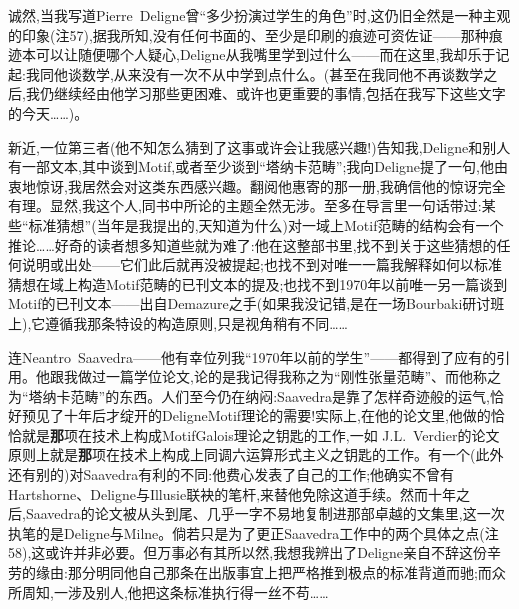 诚然,当我写道Pierre~Deligne曾“多少扮演过学生的角色”时,这仍旧全然是一种主观的印象(注57),据我所知,没有任何书面的、至少是印刷的痕迹可资佐证——那种痕迹本可以让随便哪个人疑心,Deligne从我嘴里学到过什么——而在这里,我却乐于记起:我同他谈数学,从来没有一次不从中学到点什么。(甚至在我同他不再谈数学之后,我仍继续经由他学习那些更困难、或许也更重要的事情,包括在我写下这些文字的今天……)。

\pmark 新近,一位第三者(他不知怎么猜到了这事或许会让我感兴趣!)告知我,Deligne和别人有一部文本,其中谈到Motif,或者至少谈到“塔纳卡范畴”;我向Deligne提了一句,他由衷地惊讶,我居然会对这类东西感兴趣。翻阅他惠寄的那一册,我确信他的惊讶完全有理。显然,我这个人,同书中所论的主题全然无涉。至多在导言里一句话带过:某些“标准猜想”(当年是我提出的,天知道为什么)对一域上Motif范畴的结构会有一个推论……好奇的读者想多知道些就为难了:他在这整部书里,找不到关于这些猜想的任何说明或出处——它们此后就再没被提起;也找不到对唯一一篇我解释如何以标准猜想在域上构造Motif范畴的已刊文本的提及;也找不到1970年以前唯一另一篇谈到Motif的已刊文本——出自Demazure之手(如果我没记错,是在一场Bourbaki研讨班上),它遵循我那条特设的构造原则,只是视角稍有不同……

\pmark 连Neantro~Saavedra——他有幸位列我“1970年以前的学生”——都得到了应有的引用。他跟我做过一篇学位论文,论的是我记得我称之为“刚性张量范畴”、而他称之为“塔纳卡范畴”的东西。人们至今仍在纳闷:Saavedra是靠了怎样奇迹般的运气,恰好预见了十年后才绽开的DeligneMotif理论的需要!实际上,在他的论文里,他做的恰恰就是\textbf{那}项在技术上构成MotifGalois理论之钥匙的工作,一如 J.L.~Verdier的论文原则上就是\textbf{那}项在技术上构成上同调六运算形式主义之钥匙的工作。有一个(此外还有别的)对Saavedra有利的不同:他费心发表了自己的工作;他确实不曾有Hartshorne、Deligne与Illusie联袂的笔杆,来替他免除这道手续。然而十年之后,Saavedra的论文被从头到尾、几乎一字不易地复制进那部卓越的文集里,这一次执笔的是Deligne与Milne。倘若只是为了更正Saavedra工作中的两个具体之点(注58),这或许并非必要。但万事必有其所以然,我想我辨出了Deligne亲自不辞这份辛劳的缘由:那分明同他自己那条在出版事宜上把严格推到极点的标准背道而驰;而众所周知,一涉及别人,他把这条标准执行得一丝不苟……


